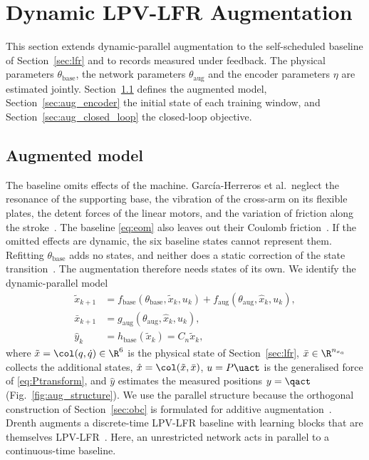 \section{Dynamic LPV-LFR Augmentation}\label{sec:augmentation}

This section extends dynamic-parallel augmentation to the self-scheduled
baseline of Section~\ref{sec:lfr} and to records measured under feedback.
The physical parameters $\theta_{\mathrm{base}}$, the network parameters
$\theta_{\mathrm{aug}}$ and the encoder parameters $\eta$ are estimated
jointly.
Section~\ref{sec:aug_structure} defines the augmented model,
Section~\ref{sec:aug_encoder} the initial state of each training window, and
Section~\ref{sec:aug_closed_loop} the closed-loop objective.

\subsection{Augmented model}\label{sec:aug_structure}
The baseline omits effects of the machine.
Garc\'ia-Herreros et al.\ neglect the resonance of the supporting base, the
vibration of the cross-arm on its flexible plates, the detent forces of the
linear motors, and the variation of friction along the
stroke~\cite[Sec.~2.4]{garcia2013model}.
The baseline \eqref{eq:eom} also leaves out their Coulomb
friction~\cite[Sec.~2.2]{garcia2013model}.
If the omitted effects are dynamic, the six baseline states cannot represent
them.
Refitting $\theta_{\mathrm{base}}$ adds no states, and neither does a static
correction of the state transition~\cite[Sec.~2]{hoekstra2025lfr}.
The augmentation therefore needs states of its own.
We identify the dynamic-parallel model~\cite[Table~1]{hoekstra2025lfr}
\begin{equation}
\begin{aligned}
 \tilde x_{k+1}
 &=f_{\mathrm{base}}(\theta_{\mathrm{base}},\tilde x_k,u_k)
   +f_{\mathrm{aug}}(\theta_{\mathrm{aug}},\hat x_k,u_k),\\
 \bar x_{k+1}
 &=g_{\mathrm{aug}}(\theta_{\mathrm{aug}},\hat x_k,u_k),\\
 \hat y_k&=h_{\mathrm{base}}(\tilde x_k)=C_n\tilde x_k ,
\end{aligned}
\label{eq:aug_transition}
\end{equation}
where $\tilde x=\col(q,\dot q)\in\R^6$ is the physical state of
Section~\ref{sec:lfr}, $\bar x\in\R^{n_{x_a}}$ collects the additional
states, $\hat x=\col(\tilde x,\bar x)$, $u=P\uact$ is the generalised force
of \eqref{eq:Ptransform}, and $\hat y$ estimates the measured positions
$y=\qact$ (Fig.~\ref{fig:aug_structure}).
We use the parallel structure because the orthogonal construction of
Section~\ref{sec:obc} is formulated for additive
augmentation~\cite{gyorok2026obc}.
Drenth augments a discrete-time LPV-LFR baseline with learning blocks that
are themselves LPV-LFR~\cite[Sec.~5.2]{drenth2025thesis}.
Here, an unrestricted network acts in parallel to a continuous-time
baseline.

